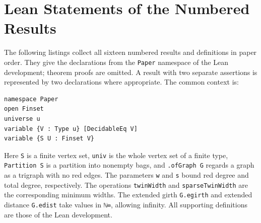 \section{Lean Statements of the Numbered Results}
\label{app:lean-statements}

\begingroup
\raggedbottom
{}

The following listings collect all sixteen numbered results and definitions
in paper order. They give the declarations from the \texttt{Paper} namespace
of the Lean development; theorem proofs are omitted. A result with two
separate assertions is represented by two declarations where appropriate.
The common context is:
\begin{lstlisting}
namespace Paper
open Finset
universe u
variable {V : Type u} [DecidableEq V]
variable {S U : Finset V}
\end{lstlisting}

Here \lstinline|S| is a finite vertex set, \lstinline|univ| is the whole
vertex set of a finite type, \lstinline|Partition S| is a partition into
nonempty bags, and \lstinline|.ofGraph G| regards a graph as a trigraph
with no red edges. The parameters \lstinline|w| and \lstinline|s| bound
red degree and total degree, respectively. The operations
\lstinline|twinWidth| and \lstinline|sparseTwinWidth| are the corresponding
minimum widths. The extended girth \lstinline|G.egirth| and extended
distance \lstinline|G.edist| take values in \lstinline|ℕ∞|, allowing
infinity. All supporting definitions are those of the Lean development.

